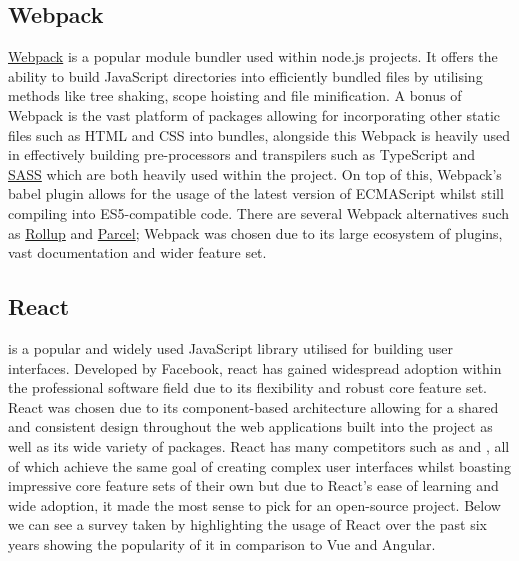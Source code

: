 \documentclass{l4proj}
\begin{document}
\subsection{Webpack}
\href{https://webpack.js.org/}{Webpack} \text is a popular module bundler used within node.js projects. It offers the ability to build JavaScript directories into efficiently bundled files by utilising methods like tree shaking, scope hoisting and file minification. A bonus of Webpack is the vast platform of packages allowing for incorporating other static files such as HTML and CSS into bundles, alongside this Webpack is heavily used in effectively building pre-processors and transpilers such as TypeScript and \href{https://sass-lang.com/}{SASS} which are both heavily used within the project. On top of this, Webpack's babel plugin allows for the usage of the latest version of ECMAScript whilst still compiling into ES5-compatible code. There are several Webpack alternatives such as \href{https://rollupjs.org/}{Rollup} and \href{https://parceljs.org/}{Parcel}; Webpack was chosen due to its large ecosystem of plugins, vast documentation and wider feature set. 

\subsection{React}

\cite{React} \text is a popular and widely used JavaScript library utilised for building user interfaces. Developed by Facebook, react has gained widespread adoption within the professional software field due to its flexibility and robust core feature set. React was chosen due to its component-based architecture allowing for a shared and consistent design throughout the web applications built into the project as well as its wide variety of packages. React has many competitors such as \cite{Vue} and \cite{Angular}, all of which achieve the same goal of creating complex user interfaces whilst boasting impressive core feature sets of their own but due to React's ease of learning and wide adoption, it made the most sense to pick for an open-source project. Below we can see a survey taken by \cite{stateofjs} highlighting the usage of React over the past six years showing the popularity of it in comparison to Vue and Angular.
\end{document}
